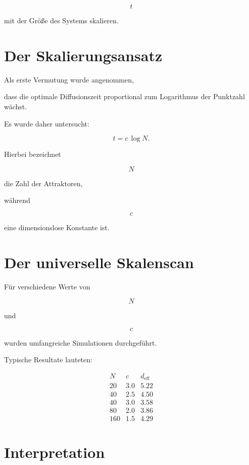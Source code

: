 \[
t
\]

mit der Größe des Systems skalieren.


\section*{Der Skalierungsansatz}

Als erste Vermutung wurde angenommen,

dass die optimale Diffusionszeit proportional zum Logarithmus der Punktzahl wächst.

Es wurde daher untersucht:

\[
\boxed{
t
=
c
\,
\log N.
}
\]

Hierbei bezeichnet

\[
N
\]

die Zahl der Attraktoren,

während

\[
c
\]

eine dimensionslose Konstante ist.


\section*{Der universelle Skalenscan}

Für verschiedene Werte von

\[
N
\]

und

\[
c
\]

wurden umfangreiche Simulationen durchgeführt.

Typische Resultate lauteten:

\[
\begin{array}{c|c|c}
N
&
c
&
d_{\mathrm{eff}}
\\
\hline
20
&
3.0
&
5.22
\\
40
&
2.5
&
4.50
\\
40
&
3.0
&
3.58
\\
80
&
2.0
&
3.86
\\
160
&
1.5
&
4.29
\end{array}
\]


\section*{Interpretation}


